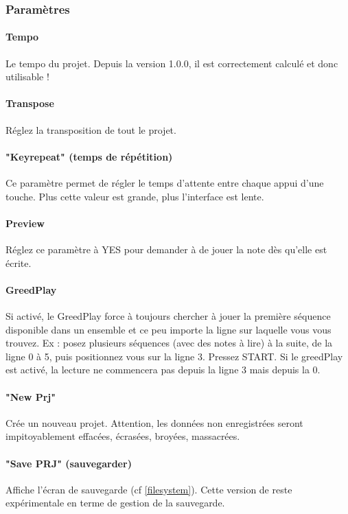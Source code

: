 \documentclass[12pt,a4paper]{article}
\begin{document}
        \subsubsection{Paramètres}
        
        \paragraph{Tempo} Le tempo du projet. Depuis la version 1.0.0, il est correctement calculé et donc utilisable !

        \paragraph{Transpose} Réglez la transposition de tout le projet.
        
        \paragraph{"Keyrepeat" (temps de répétition)} Ce paramètre permet de régler le temps d'attente entre chaque appui d'une touche. Plus cette valeur est grande, plus l'interface est lente.

        \paragraph{Preview} Réglez ce paramètre à YES pour demander à \FAT de jouer la note dès qu'elle est écrite.

        \paragraph{GreedPlay} Si activé, le GreedPlay force \FAT à toujours chercher à jouer la première séquence disponible dans un ensemble et ce peu importe la ligne sur laquelle vous vous trouvez. Ex : posez plusieurs séquences (avec des notes à lire) à la suite, de la ligne 0 à 5, puis positionnez vous sur la ligne 3. Pressez START. Si le greedPlay est activé, la lecture ne commencera pas depuis la ligne 3 mais depuis la 0.

        \paragraph{"New Prj"} Crée un nouveau projet. Attention, les données non enregistrées seront impitoyablement effacées, écrasées, broyées, massacrées.
        
        \paragraph{"Save PRJ" (sauvegarder)}  Affiche l'écran de sauvegarde (cf \ref{filesystem}). Cette version de \FAT reste expérimentale en terme de gestion de la sauvegarde.
        
\end{document}
